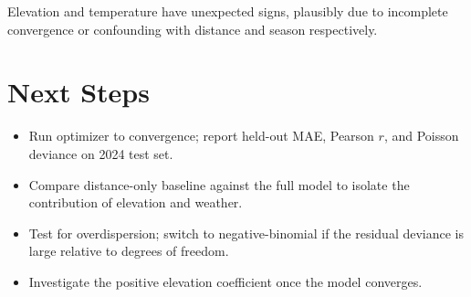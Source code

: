 \documentclass[twoside,11pt]{article}
\begin{document}
Elevation and temperature have unexpected signs, plausibly due to incomplete convergence or confounding with distance and season respectively.

\section{Next Steps}
\begin{itemize}\setlength\itemsep{1pt}
  \item Run optimizer to convergence; report held-out MAE, Pearson $r$, and Poisson deviance on 2024 test set.
  \item Compare distance-only baseline against the full model to isolate the contribution of elevation and weather.
  \item Test for overdispersion; switch to negative-binomial if the residual deviance is large relative to degrees of freedom.
  \item Investigate the positive elevation coefficient once the model converges.
\end{itemize}


\end{document}
